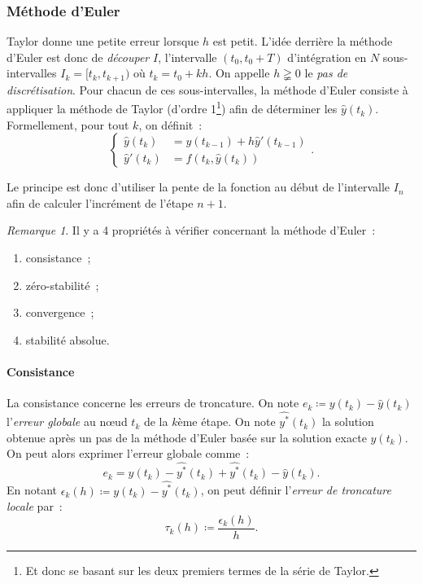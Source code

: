 \documentclass{article}
\theoremstyle{definition}
\theoremstyle{remark}
\newtheorem*{rmq}{Remarque}
\begin{document}
		\subsubsection{Méthode d'Euler}
		Taylor donne une petite erreur lorsque $h$ est petit. L'idée derrière la méthode d'Euler est donc de \emph{découper} $I$, l'intervalle $(t_0, t_0+T)$
		d'intégration en $N$ sous-intervalles $I_k = [t_k, t_{k+1})$ où $t_k = t_0 + kh$. On appelle $h \gneqq 0$ le \emph{pas de discrétisation}. Pour chacun
		de ces sous-intervalles, la méthode d'Euler consiste à appliquer la méthode de Taylor (d'ordre 1\footnote{Et donc se basant sur les deux premiers termes
		de la série de Taylor.}) afin de déterminer les $\widehat y(t_k)$. Formellement, pour tout $k$, on définit~:
		\[\begin{cases}\widehat y(t_k) &= \widehat y(t_{k-1}) + h\widehat y'(t_{k-1}) \\\widehat y'(t_k) &= f(t_k, \widehat y(t_k))\end{cases}.\]

		Le principe est donc d'utiliser la pente de la fonction au début de l'intervalle $I_n$ afin de calculer l'incrément de l'étape $n+1$.

		\begin{rmq} Il y a 4 propriétés à vérifier concernant la méthode d'Euler~:
		\begin{enumerate}
			\item consistance~;
			\item zéro-stabilité~;
			\item convergence~;
			\item stabilité absolue.
		\end{enumerate}
		\end{rmq}

		\paragraph{Consistance} La consistance concerne les erreurs de troncature. On note $e_k \coloneqq y(t_k) - \widehat y(t_k)$ l'\emph{erreur globale} au
		nœud $t_k$ de la $k$ème étape. On note $\widehat {y^*}(t_k)$ la solution obtenue après un pas de la méthode d'Euler basée sur la solution exacte
		$y(t_k)$. On peut alors exprimer l'erreur globale comme~:
		\[e_k = y(t_k) - \widehat {y^*}(t_k) + \widehat {y^*}(t_k) - \widehat y(t_k).\]
		En notant $\epsilon_k(h) \coloneqq y(t_k) - \widehat {y^*}(t_k)$, on peut définir l'\emph{erreur de troncature locale} par~:
		\[\tau_k(h) \coloneqq \frac {\epsilon_k(h)}h.\]
\end{document}

